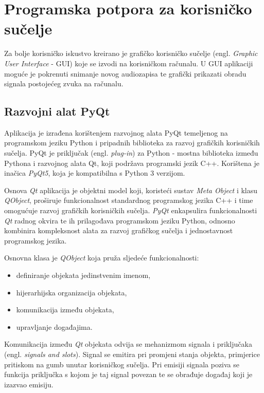 \chapter{Programska potpora za korisničko sučelje}

Za bolje korisničko iskustvo kreirano je grafičko korisničko sučelje (engl. \textit{Graphic User Interface} - GUI) koje se izvodi na korisničkom računalu. U GUI aplikaciji moguće je pokrenuti snimanje novog audiozapisa te grafički prikazati obradu signala postojećeg zvuka na računalu. 

\section{Razvojni alat PyQt} 
Aplikacija je izrađena korištenjem razvojnog alata PyQt temeljenog na programskom
jeziku Python i pripadnih biblioteka za razvoj grafičkih korisničkih sučelja. PyQt je priključak (engl. \textit{plug-in}) za Python - mostna biblioteka između Pythona i razvojnog alata Qt, koji podržava programski jezik C++. Korištena je inačica \textit{PyQt5}, koja je kompatibilna s Python 3 verzijom. \cite{pyqt} 

Osnova \textit{Qt} aplikacija je objektni model koji, koristeći sustav \textit{Meta Object} i klasu \textit{QObject}, proširuje funkcionalnost standardnog programskog jezika C++ i time omogućuje razvoj grafičkih korisničkih sučelja. \textit{PyQt} enkapsulira funkcionalnosti \textit{Qt} radnog okvira te ih prilagođava programskom jeziku Python, odnosno kombinira kompleksnost alata za razvoj grafičkog sučelja i jednostavnost programskog jezika. \cite{qt}

Osnovna klasa je \textit{QObject} koja pruža sljedeće funkcionalnosti:
\begin{itemize}
	\item definiranje objekata jedinstvenim imenom,
	\item hijerarhijska organizacija objekata,
	\item komunikacija između objekata, 
	\item upravljanje događajima.
\end{itemize}

Komunikacija između \textit{Qt} objekata odvija se mehanizmom signala i priključaka (engl. \textit{signals and slots}). Signal se emitira pri promjeni stanja objekta, primjerice pritiskom na gumb unutar korisničkog sučelja. Pri emisiji signala poziva se funkcija priključka s kojom je taj signal povezan te se obrađuje događaj koji je izazvao emisiju. 

